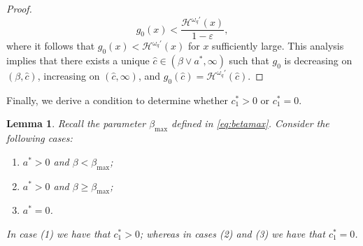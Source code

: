 \documentclass[10pt,a4paper]{amsart}
\newtheorem{lemma}{Lemma}[section]
\newcommand{\cH}{\mathcal{H}}
\newcommand{\homega}{\omega_q}
\renewcommand{\geq}{\geqslant}
\begin{document}
\begin{proof}
	\[
	g_0(x) < \frac{\cH^{\homega\prime}(x)}{1-\varepsilon},
	\]
	where it follows that $g_0(x) < \cH^{\homega\prime}(x)$ for $x$ sufficiently large. This analysis implies that there exists a unique $\hat{c} \in (\beta \vee a^\ast,\infty)$ such that $g_0$ is decreasing on $(\beta,\hat{c})$, increasing on $(\hat{c},\infty)$, and $g_0(\hat{c}) = \cH^{\homega\prime}(\hat{c})$.
\end{proof}
Finally, we derive a condition to determine whether $c_1^\ast > 0 $ or $c_1^\ast=0$.
\begin{lemma}\label{lemma.condition}
	Recall the parameter $\beta_{\max}$ defined in \eqref{eq:betamax}. Consider the following cases:
	\begin{enumerate}
		\item $a^\ast > 0$ and $\beta < \beta_{\max}$;
		\item $a^\ast > 0$ and $\beta \geq \beta_{\max}$;
		\item $a^\ast = 0$.
	\end{enumerate}
	In case (1) we have that $c_1^\ast > 0$; whereas in cases (2) and (3) we have that $c_1^\ast=0$.
\end{lemma}
\end{document}
